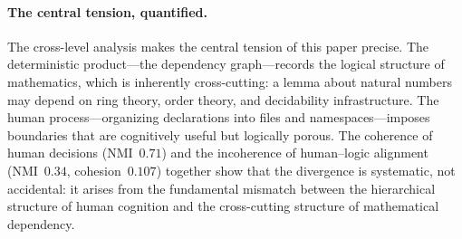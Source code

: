 \paragraph{The central tension, quantified.} The cross-level analysis makes the central tension of this paper precise. The deterministic product---the dependency graph---records the logical structure of mathematics, which is inherently cross-cutting: a lemma about natural numbers may depend on ring theory, order theory, and decidability infrastructure. The human process---organizing declarations into files and namespaces---imposes boundaries that are cognitively useful but logically porous. The coherence of human decisions (NMI~$0.71$) and the incoherence of human--logic alignment (NMI~$0.34$, cohesion~$0.107$) together show that the divergence is systematic, not accidental: it arises from the fundamental mismatch between the hierarchical structure of human cognition and the cross-cutting structure of mathematical dependency.
